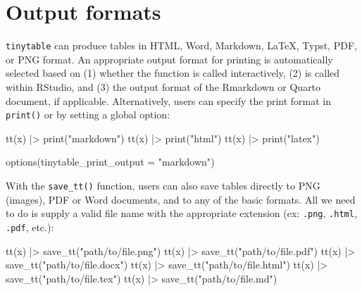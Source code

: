 \documentclass[
  letterpaper,
  DIV=11,
  numbers=noendperiod]{scrartcl}
\newenvironment{Shaded}{\begin{snugshade}}{\end{snugshade}}
\newcommand{\AttributeTok}[1]{\textcolor[rgb]{0.40,0.45,0.13}{#1}}
\newcommand{\FunctionTok}[1]{\textcolor[rgb]{0.28,0.35,0.67}{#1}}
\newcommand{\NormalTok}[1]{\textcolor[rgb]{0.00,0.23,0.31}{#1}}
\newcommand{\SpecialCharTok}[1]{\textcolor[rgb]{0.37,0.37,0.37}{#1}}
\newcommand{\StringTok}[1]{\textcolor[rgb]{0.13,0.47,0.30}{#1}}
\begin{document}
\section{Output formats}\label{output-formats}

\texttt{tinytable} can produce tables in HTML, Word, Markdown, LaTeX,
Typst, PDF, or PNG format. An appropriate output format for printing is
automatically selected based on (1) whether the function is called
interactively, (2) is called within RStudio, and (3) the output format
of the Rmarkdown or Quarto document, if applicable. Alternatively, users
can specify the print format in \texttt{print()} or by setting a global
option:

\begin{Shaded}
\begin{Highlighting}[]
\FunctionTok{tt}\NormalTok{(x) }\SpecialCharTok{|\textgreater{}} \FunctionTok{print}\NormalTok{(}\StringTok{"markdown"}\NormalTok{)}
\FunctionTok{tt}\NormalTok{(x) }\SpecialCharTok{|\textgreater{}} \FunctionTok{print}\NormalTok{(}\StringTok{"html"}\NormalTok{)}
\FunctionTok{tt}\NormalTok{(x) }\SpecialCharTok{|\textgreater{}} \FunctionTok{print}\NormalTok{(}\StringTok{"latex"}\NormalTok{)}

\FunctionTok{options}\NormalTok{(}\AttributeTok{tinytable\_print\_output =} \StringTok{"markdown"}\NormalTok{)}
\end{Highlighting}
\end{Shaded}

With the \texttt{save\_tt()} function, users can also save tables
directly to PNG (images), PDF or Word documents, and to any of the basic
formats. All we need to do is supply a valid file name with the
appropriate extension (ex: \texttt{.png}, \texttt{.html}, \texttt{.pdf},
etc.):

\begin{Shaded}
\begin{Highlighting}[]
\FunctionTok{tt}\NormalTok{(x) }\SpecialCharTok{|\textgreater{}} \FunctionTok{save\_tt}\NormalTok{(}\StringTok{"path/to/file.png"}\NormalTok{)}
\FunctionTok{tt}\NormalTok{(x) }\SpecialCharTok{|\textgreater{}} \FunctionTok{save\_tt}\NormalTok{(}\StringTok{"path/to/file.pdf"}\NormalTok{)}
\FunctionTok{tt}\NormalTok{(x) }\SpecialCharTok{|\textgreater{}} \FunctionTok{save\_tt}\NormalTok{(}\StringTok{"path/to/file.docx"}\NormalTok{)}
\FunctionTok{tt}\NormalTok{(x) }\SpecialCharTok{|\textgreater{}} \FunctionTok{save\_tt}\NormalTok{(}\StringTok{"path/to/file.html"}\NormalTok{)}
\FunctionTok{tt}\NormalTok{(x) }\SpecialCharTok{|\textgreater{}} \FunctionTok{save\_tt}\NormalTok{(}\StringTok{"path/to/file.tex"}\NormalTok{)}
\FunctionTok{tt}\NormalTok{(x) }\SpecialCharTok{|\textgreater{}} \FunctionTok{save\_tt}\NormalTok{(}\StringTok{"path/to/file.md"}\NormalTok{)}
\end{Highlighting}
\end{Shaded}
\end{document}
